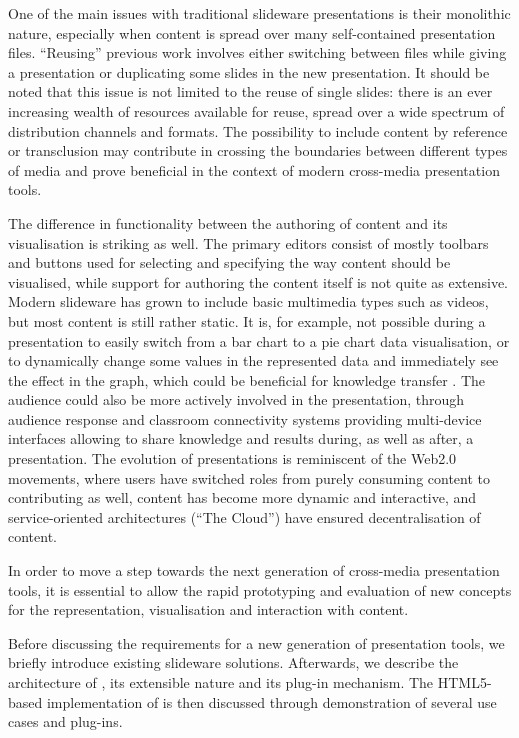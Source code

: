    One of the main issues with traditional slideware presentations is their
   monolithic nature, especially when content is spread over many
   self-contained presentation files. ``Reusing'' previous work involves either
   switching between files while giving a presentation or duplicating some
   slides in the new presentation. It should be noted that this issue is not
   limited to the reuse of single slides: there is an ever increasing wealth of
   resources available for reuse, spread over a wide spectrum of distribution
   channels and formats. The possibility to include content by reference or
   transclusion \citep{nelson-1} may contribute in crossing the boundaries
   between different types of media and prove beneficial in the context of
   modern cross-media presentation tools.

   The difference in functionality between the authoring of content and its
   visualisation is striking as well. The primary editors consist of mostly
   toolbars and buttons used for selecting and specifying the way content
   should be visualised, while support for authoring the content itself is not
   quite as extensive. Modern slideware has grown to include basic multimedia
   types such as videos, but most content is still rather static. It is, for
   example, not possible during a presentation to easily switch from a bar
   chart to a pie chart data visualisation, or to dynamically change some
   values in the represented data and immediately see the effect in the graph,
   which could be beneficial for knowledge transfer \citep{holzinger-1}. The
   audience could also be more actively involved in the presentation, through
   audience response and classroom connectivity systems providing multi-device
   interfaces allowing to share knowledge and results during, as well as after,
   a presentation. The evolution of presentations is reminiscent of the Web2.0
   movements, where users have switched roles from purely consuming content to
   contributing as well, content has become more dynamic and interactive, and
   service-oriented architectures (``The Cloud'') have ensured decentralisation
   of content.

   In order to move a step towards the next generation of cross-media
   presentation tools, it is essential to allow the rapid prototyping and
   evaluation of new concepts for the representation, visualisation and
   interaction with content.

   Before discussing the requirements for a new generation of presentation
   tools, we briefly introduce existing slideware solutions. Afterwards, we
   describe the architecture of \mxp, its extensible nature and its plug-in
   mechanism. The HTML5-based implementation of \mxp is then discussed through
   demonstration of several use cases and \mxp plug-ins.

